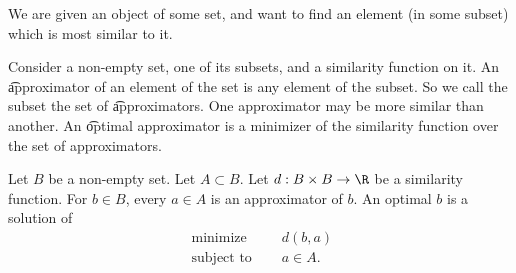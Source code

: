 
\sbasic





























\sstart
{}


We are given an object of some set, and want to find an element (in some subset) which is most similar to it.


Consider a non-empty set, one of its subsets, and a similarity function on it.
An \t{approximator} of an element of the set is any element of the subset.
So we call the subset the set of \t{approximators}.
One approximator may be more similar than another.
An \t{optimal} approximator is a minimizer of the similarity function over the set of approximators.


Let $B$ be a non-empty set.
Let $A \subset B$.
Let $d: B \times B \to \R$ be a similarity function.
For $b \in B$, every $a \in A$ is an approximator of $b$.
An optimal $b$ is a solution of
$$
\begin{aligned}
  \text{ minimize }   & \quad d(b, a) \\
  \text{ subject to } & \quad a \in A.
\end{aligned}
$$
\strats
